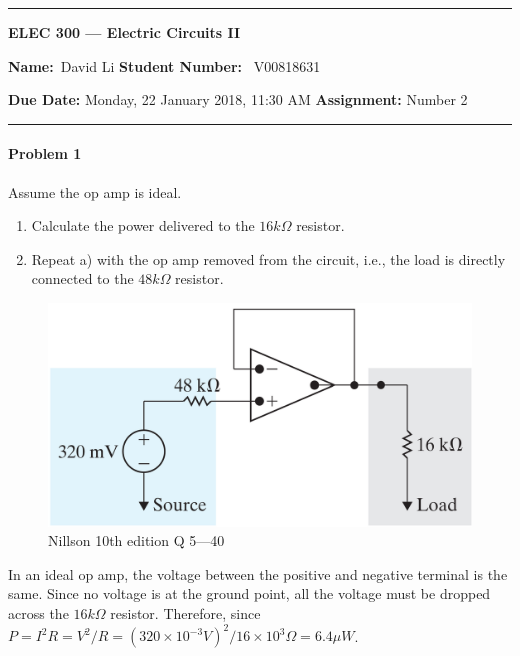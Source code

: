 \begin{center}
	\hrule
	\vspace{.4cm}
	{\textbf { \large ELEC 300 --- Electric Circuits II}}
\end{center}
{\textbf{Name:}\ David Li \hspace{\fill} \textbf{Student Number:}} \ V00818631  \\
{\textbf{Due Date:} Monday, 22 January 2018, 11:30 AM \hspace{\fill} \textbf{Assignment:} Number 2 \\
	\hrule
	
\paragraph{Problem 1}
Assume the op amp is ideal.
\begin{enumerate}[label=(\alph*)]
	\item Calculate the power delivered to the $16 k\Omega$ resistor.
	
	\item Repeat a) with the op amp removed from the circuit, i.e., the load is directly connected to
	the $48 k\Omega$ resistor.
\end{enumerate}

\begin{figure}[H]
	\centering
	\includegraphics[width=1\linewidth]{images/P1Nillson10thQ540}
	\caption{Nillson 10th edition Q 5---40}
	\label{fig:p1nillson10thq54}
\end{figure}
In an ideal op amp, the voltage between the positive and negative terminal is the same. Since no voltage is at the ground point, all the voltage must be dropped across the $16 k \Omega$ resistor. Therefore, since $P=I^2R=V^2/R= (320 \times 10 ^{-3} V)^2 / 16 \times 10^3 \Omega = 6.4 \mu W$.

}
